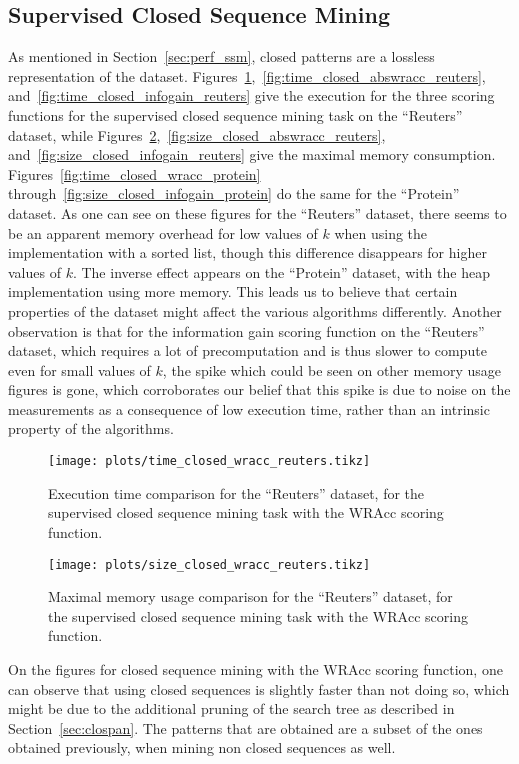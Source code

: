 \documentclass{sigkddExp}
\newcommand{\wracc}{\mathrm{WRAcc}}
\begin{document}
\subsection{Supervised Closed Sequence Mining}
\label{sec:perf_scsm}
As mentioned in Section~\ref{sec:perf_ssm}, closed patterns are a lossless representation of the dataset.
Figures~\ref{fig:time_closed_wracc_reuters},~\ref{fig:time_closed_abswracc_reuters}, and~\ref{fig:time_closed_infogain_reuters} give the execution for the three scoring functions for the supervised closed sequence mining task on the ``Reuters'' dataset, while Figures~\ref{fig:size_closed_wracc_reuters},~\ref{fig:size_closed_abswracc_reuters}, and~\ref{fig:size_closed_infogain_reuters} give the maximal memory consumption.
Figures~\ref{fig:time_closed_wracc_protein} through~\ref{fig:size_closed_infogain_protein} do the same for the ``Protein'' dataset.
As one can see on these figures for the ``Reuters'' dataset, there seems to be an apparent memory overhead for low values of \(k\) when using the implementation with a sorted list, though this difference disappears for higher values of \(k\).
The inverse effect appears on the ``Protein'' dataset, with the heap implementation using more memory.
This leads us to believe that certain properties of the dataset might affect the various algorithms differently.
Another observation is that for the information gain scoring function on the ``Reuters'' dataset, which requires a lot of precomputation and is thus slower to compute even for small values of \(k\), the spike which could be seen on other memory usage figures is gone, which corroborates our belief that this spike is due to noise on the measurements as a consequence of low execution time, rather than an intrinsic property of the algorithms.
\begin{figure}[!hbtp]
	\centering
	\texttt{[image: plots/time\_closed\_wracc\_reuters.tikz]}
	\caption{Execution time comparison for the ``Reuters'' dataset, for the supervised closed sequence mining task with the \(\wracc\) scoring function.}
	\label{fig:time_closed_wracc_reuters}
\end{figure}%
\begin{figure}[!hbtp]
	\centering
	\texttt{[image: plots/size\_closed\_wracc\_reuters.tikz]}
	\caption{Maximal memory usage comparison for the ``Reuters'' dataset, for the supervised closed sequence mining task with the \(\wracc\) scoring function.}
	\label{fig:size_closed_wracc_reuters}
\end{figure}
On the figures for closed sequence mining with the \(\wracc\) scoring function, one can observe that using closed sequences is slightly faster than not doing so, which might be due to the additional pruning of the search tree as described in Section~\ref{sec:clospan}.
The patterns that are obtained are a subset of the ones obtained previously, when mining non closed sequences as well.
\end{document}
